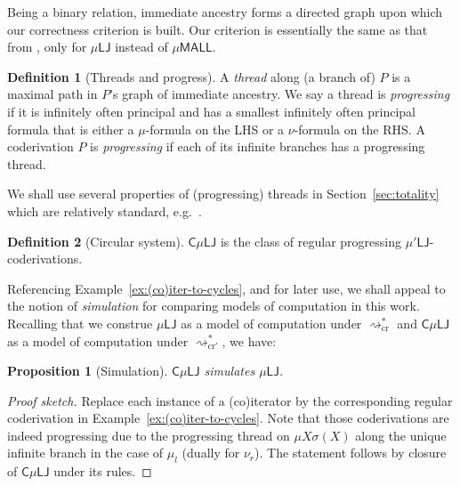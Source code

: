 \documentclass[10pt,a4paper]{amsart}
\theoremstyle{plain}
\newtheorem{proposition}[proposition]{Proposition}
\theoremstyle{definition}
\newtheorem{defn}[defn]{Definition}
\renewcommand{\todo}[1]{}
\theoremstyle{plain}
\theoremstyle{definition} %
\newcommand{\lr}[1]{#1_l}
\newcommand{\rr}[1]{#1_r}
\newcommand{\LJ}{\mathsf{LJ}}
\newcommand{\muLJ}{\mu\LJ}
\newcommand{\muLJnorec}{\mu'\LJ}
\newcommand{\circular}{\mathsf C}
\newcommand{\cmuLJ}{\circular\muLJ}
\newcommand{\MALL}{\mathsf{MALL}}
\newcommand{\muMALL}{\mu\MALL}
\newcommand{\rewrite}{\rightsquigarrow}
\newcommand{\cutreduction}{\mathrm{cr}}
\newcommand{\cutred}{\rewrite_{\cutreduction}}
\newcommand{\cutreductionnorec}{\mathrm{cr}'}
\newcommand{\cutrednorec}{\rewrite_{\cutreductionnorec}}
\newcommand{\der}{P}
\begin{document}
Being a binary relation, immediate ancestry forms a directed graph upon which our correctness criterion is built. 
Our criterion is essentially the same as that from \cite{BaeldeDS16Infinitaryprooftheory}, only for $\muLJ$ instead of $\muMALL$. 



\begin{defn}
    [Threads and progress]\label{defn:progressiveness}
    A \emph{thread} along (a branch of) $\der$ is a maximal path in $\der$'s graph of immediate ancestry.
We say a thread is \emph{progressing} if it is infinitely often principal and has a smallest infinitely often principal formula that is either a $\mu$-formula on the LHS or a $\nu$-formula on the RHS.
% 
A coderivation $\der$ is \emph{progressing} if each of its infinite branches has a progressing thread.
\end{defn}

We shall use several properties of (progressing) threads in Section~\ref{sec:totality} 
which are relatively standard, e.g.~\cite{Koz83:results-on-mu,Studer08:mu-calc,KupMarVen22:graph-reps-mu-forms}.

\begin{defn}
    [Circular system]
    $\cmuLJ$ is the class of regular progressing $\muLJnorec$-coderivations.
\end{defn}


Referencing Example~\ref{ex:(co)iter-to-cycles}, and for later use, we shall appeal to the notion of \emph{simulation} for comparing models of computation in this work. 
Recalling that we construe $\muLJ$ as a model of computation under $\cutred^*$ and $\cmuLJ$ as a model of computation under $\cutrednorec^*$, we have:

\begin{proposition}[Simulation]
\label{prop:cmulj-simulates-mulj}
$\cmuLJ$ simulates $\muLJ$.
\end{proposition}

\begin{proof}[Proof sketch]
    Replace each instance of a (co)iterator by the corresponding regular coderivation in Example~\ref{ex:(co)iter-to-cycles}.
    Note that those coderivations are indeed progressing due to the progressing thread on $\mu X \sigma(X)$ along the unique infinite branch in the case of $\lr \mu$ (dually for $\rr \nu$).
    The statement follows by closure of $\cmuLJ$ under its rules.
\end{proof}
\end{document}
